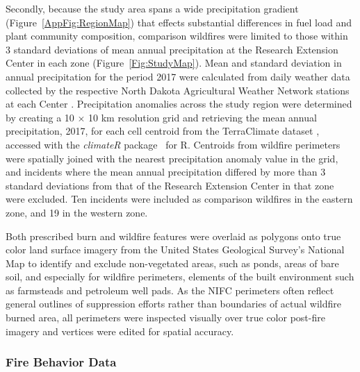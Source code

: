 \documentclass[fire,article,accept,oneauthor,pdftex]{Definitions/mdpi}
\begin{document}
Secondly, because the study area spans a wide precipitation gradient (Figure~\ref{AppFig:RegionMap}) that effects substantial differences in fuel load and plant community composition, comparison wildfires were limited to those within 3 standard deviations of mean annual precipitation at the Research Extension Center in each zone (Figure~\ref{Fig:StudyMap}).
Mean and standard deviation in annual precipitation for the period 2017 were calculated from daily weather data collected by the respective North Dakota Agricultural Weather Network stations at each Center \cite{ndawn2025, ndawn2025a}. 
Precipitation anomalies across the study region were determined by creating a 10 $\times$ 10 km resolution grid and retrieving the mean annual precipitation, 2017, for each cell centroid from the TerraClimate dataset \cite{abatzoglou2018}, accessed with the \emph{climateR} %
 package~\cite{johnson2021} for \textsf{R}. 
Centroids from wildfire perimeters were spatially joined with the nearest precipitation anomaly value in the grid, and incidents where the mean annual precipitation differed  by more than 3 standard deviations from that of the Research Extension Center in that zone were excluded.
Ten incidents were included as comparison wildfires in the eastern zone, and 19 in the western zone. 

Both prescribed burn and wildfire features were overlaid as polygons onto true color land surface imagery from the United States Geological Survey's National Map \cite{usgs_nm} to identify and exclude non-vegetated areas, such as ponds, areas of bare soil, and especially for wildfire perimeters, elements of the built environment such as farmsteads and petroleum well pads. 
As the NIFC perimeters often reflect general outlines of suppression efforts rather than boundaries of actual wildfire burned area, all perimeters were inspected visually over true color post-fire imagery and vertices were edited for spatial accuracy.  

\subsubsection{Fire Behavior Data}
\end{document}
